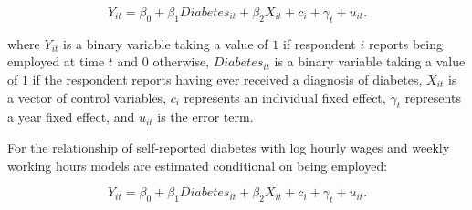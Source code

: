 \noindent 
\begin{equation}
Y_{it}=\beta_{0}+\beta_{1}Diabetes_{it}+\beta_{2}X_{it}+c_{i}+\gamma_{t}+u_{it}.\label{eq:employed}
\end{equation}


where $Y_{it}$ is a binary variable taking a value of $1$ if respondent
$i$ reports being employed at time $t$ and $0$ otherwise, $Diabetes_{it}$
is a binary variable taking a value of $1$ if the respondent reports
having ever received a diagnosis of diabetes, $X_{it}$ is a vector
of control variables, $c_{i}$ represents an individual fixed effect,
$\gamma_{t}$ represents a year fixed effect, and $u_{it}$ is the
error term.

For the relationship of self-reported diabetes with log hourly wages
 and weekly working hours models are estimated conditional on being
employed:

\noindent 
\begin{equation}
Y_{it}=\beta_{0}+\beta_{1}Diabetes_{it}+\beta_{2}X_{it}+c_{i}+\gamma_{t}+u_{it}.\label{eq:income_working-hours}
\end{equation}


